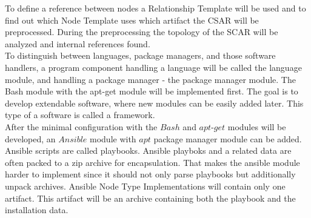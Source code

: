 To define a reference between nodes a Relationship Template will be used and to find out which Node Template uses which artifact the CSAR will be preprocessed.
During the preprocessing the topology of the SCAR will be analyzed and internal references found.\\
To distinguish between languages, package managers, and those software handlers, a program component handling a language will be called the language module, and handling a package manager - the package manager module.
The Bash module with the apt-get module will be implemented first. 
The goal is to develop extendable software, where new modules can be easily added later.
This type of a software is called a framework.\\
After the minimal configuration with the $Bash$ and $apt$-$get$ modules will be developed, an $Ansible$ module with $apt$ package manager module can be added. 
Ansible scripts are called playbooks. 
Ansible playboks and a related data are often packed to a zip archive for encapsulation.
That makes the ansible module harder to implement since it should not only parse playbooks but additionally unpack archives. Ansible Node Type Implementations will contain only one artifact.
This artifact will be an archive containing both the playbook and the installation data.
